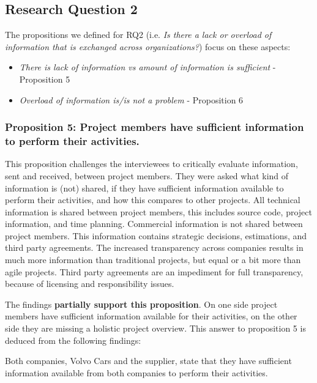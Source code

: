 \subsection{Research Question 2}\label{sec:ResearchQuestion2}

The propositions we defined for  
RQ2 (i.e. {\em Is there a lack or overload of information that is exchanged across organizations?}) focus on these aspects:

\begin{itemize}
\item {\em There is lack of information vs amount of information is sufficient} - Proposition 5 %
\item {\em Overload of information is/is not a problem} - Proposition 6
\end{itemize}

\vspace{.2cm}
\subsubsection{Proposition 5: Project members have sufficient information to perform their activities.}

This proposition challenges the interviewees to critically evaluate information, sent and received, between project members. They were asked what kind of information is (not) shared, if they have sufficient information available to perform their activities, and how this compares to other projects. All technical information is shared between project members, this includes source code, project information, and time planning. Commercial information is not shared between project members. This information contains strategic decisions, estimations, and third party agreements. The increased transparency across companies results in much more information than traditional projects, but equal or a bit more than agile projects. Third party agreements are an impediment for full transparency, because of licensing and responsibility issues.

The findings {\bf partially support this proposition}. On one side project members have sufficient information available for their activities, on the other side they are missing a holistic project overview. This answer to proposition 5 is deduced from the following findings:

 Both companies, Volvo Cars and the supplier, state that they have sufficient information available from both companies to perform their activities. 

